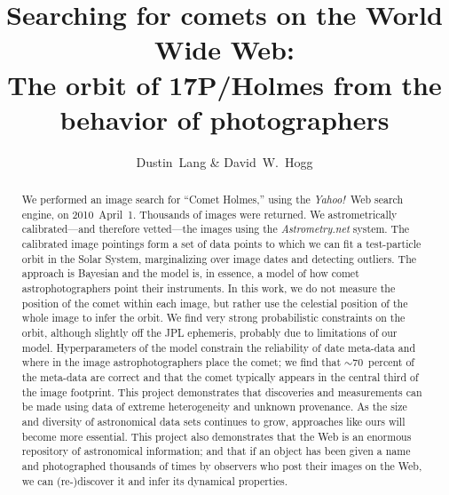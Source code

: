 \documentclass[12pt,preprint]{aastex}
\newcommand{\project}[1]{\textsl{#1}}
\newcommand{\yahoo}{Yahoo!}
\newcommand{\Yahoo}{\project{\yahoo}}
\begin{document}
\title{Searching for comets on the World Wide Web:\\
       The orbit of 17P/Holmes from the behavior of photographers}
\author{Dustin~Lang \&
        David~W.~Hogg}

\begin{abstract}
We performed an image search for ``Comet Holmes,'' using the
\Yahoo\ Web search engine, on 2010~April~1.  Thousands of images were
returned.  We astrometrically calibrated---and therefore vetted---the
images using the \project{Astrometry.net} system.  The calibrated
image pointings form a set of data points to which we can fit a
test-particle orbit in the Solar System, marginalizing over image
dates and detecting outliers.  The approach is Bayesian and the model
is, in essence, a model of how comet astrophotographers point their
instruments.  In this work, we do not measure the position of the
comet within each image, but rather use the celestial position of the
whole image to infer the orbit.  We find very strong probabilistic
constraints on the orbit, although slightly off the JPL ephemeris,
probably due to limitations of our model.  Hyperparameters of the
model constrain the reliability of date meta-data and where in the
image astrophotographers place the comet; we find that $\sim
70$~percent of the meta-data are correct and that the comet typically
appears in the central third of the image footprint.  This project
demonstrates that discoveries and measurements can be made using data
of extreme heterogeneity and unknown provenance.  As the size and
diversity of astronomical data sets continues to grow, approaches like
ours will become more essential.  This project also demonstrates that
the Web is an enormous repository of astronomical information; and
that if an object has been given a name and photographed thousands of
times by observers who post their images on the Web, we can
(re-)discover it and infer its dynamical properties.
\end{abstract}

\end{document}
